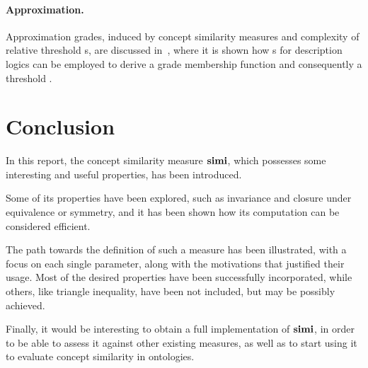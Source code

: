   \paragraph{Approximation.} Approximation grades, induced by concept similarity measures and complexity of relative threshold \dl{}s, are discussed in~\cite{Ba17}, where it is shown how \csm{}s for \el description logics can be employed to derive a grade membership function and consequently a threshold \dl.

  \section{Conclusion}

  In this report, the concept similarity measure \(\mathbf{simi}\), which possesses some interesting and useful properties, has been introduced.

  Some of its properties have been explored, such as invariance and closure under equivalence or symmetry, and it has been shown how its computation can be considered efficient.

  The path towards the definition of such a measure has been illustrated, with a focus on each single parameter, along with the motivations that justified their usage.
  Most of the desired properties have been successfully incorporated, while others, like triangle inequality, have been not included, but may be possibly achieved.

  Finally, it would be interesting to obtain a full implementation of \(\mathbf{simi}\), in order to be able to assess it against other existing measures, as well as to start using it to evaluate concept similarity in ontologies.
